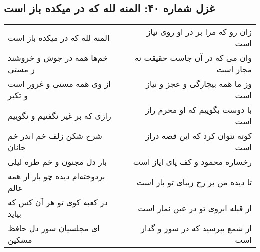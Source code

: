 \begin{center}
\section*{غزل شماره ۴۰: المنه لله که در میکده باز است}
\label{sec:sh040}
\begin{longtable}{l p{0.5cm} r}
المنة لله که در میکده باز است
&&
زان رو که مرا بر در او روی نیاز است
\\
خم‌ها همه در جوش و خروشند ز مستی
&&
وان می که در آن جاست حقیقت نه مجاز است
\\
از وی همه مستی و غرور است و تکبر
&&
وز ما همه بیچارگی و عجز و نیاز است
\\
رازی که بر غیر نگفتیم و نگوییم
&&
با دوست بگوییم که او محرم راز است
\\
شرح شکن زلف خم اندر خم جانان
&&
کوته نتوان کرد که این قصه دراز است
\\
بار دل مجنون و خم طره لیلی
&&
رخساره محمود و کف پای ایاز است
\\
بردوخته‌ام دیده چو باز از همه عالم
&&
تا دیده من بر رخ زیبای تو باز است
\\
در کعبه کوی تو هر آن کس که بیاید
&&
از قبله ابروی تو در عین نماز است
\\
ای مجلسیان سوز دل حافظ مسکین
&&
از شمع بپرسید که در سوز و گداز است
\\
\end{longtable}
\end{center}
